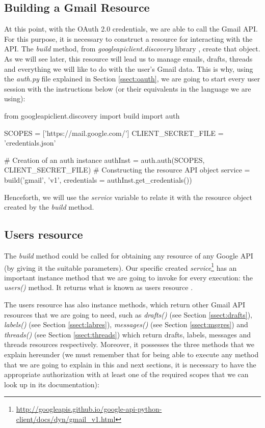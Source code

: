 \subsection{Building a Gmail Resource} \label{ssect:gmailres}
At this point, with the OAuth 2.0 credentials, we are able to call the Gmail API. For this purpose, it is necessary to construct a resource \citep[/v1/reference]{gmailAPI} for interacting with the API. The \textit{build} method, from \textit{googleapiclient.discovery} library \citep{build-module}, create that object. As we will see later, this resource will lead us to manage emails, drafts, threads and everything we will like to do with the user's Gmail data. This is why, using the \textit{auth.py} file explained in Section \ref{ssect:oauth}, we are going to start every user session with the instructions below (or their equivalents in the language we are using):

\begin{python}
from googleapiclient.discovery import build
import auth

SCOPES = ['https://mail.google.com/']
CLIENT_SECRET_FILE = 'credentials.json'

# Creation of an auth instance
authInst = auth.auth(SCOPES, CLIENT_SECRET_FILE)
# Constructing the resource API object
service = build('gmail', 'v1', credentials = authInst.get_credentials())
\end{python}

Henceforth, we will use the \textit{service} variable to relate it with the resource object created by the \textit{build} method.

\subsection{Users resource}\label{ssect:userres}
The \textit{build} method could be called for obtaining any resource of any Google API (by giving it the suitable parameters). Our specific created \textit{service}\footnote{\url{http://googleapis.github.io/google-api-python-client/docs/dyn/gmail\_v1.html}} has an important instance method that we are going to invoke for every execution: the \textit{users()} method. It returns what is known as users resource \citep[/v1/reference/users]{gmailAPI}.

The users resource has also instance methods, which return other Gmail API resources that we are going to need, such as \textit{drafts()} (see Section \ref{ssect:drafts}), \textit{labels()} (see Section \ref{ssect:labres}), \textit{messages()} (see Section \ref{ssect:msgres}) and \textit{threads()} (see Section \ref{ssect:threads}) which return drafts, labels, messages and threads resources respectively. Moreover, it possesses the three methods that we explain hereunder (we must remember that for being able to execute any method that we are going to explain in this and next sections, it is necessary to have the appropriate authorization with at least one of the required scopes that we can look up in its documentation):

